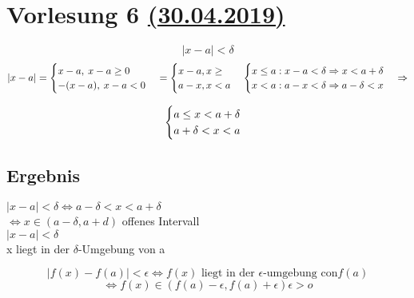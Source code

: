 \section{Vorlesung 6 \href{https://tu-dresden.de/mn/math/algebra/das-institut/beschaeftigte/antje-noack/ressourcen/dateien/v120-1/MathMethInf06.pdf?lang=en}{(30.04.2019)} }


\[|x-a| < \delta \]
\begin{equation}
\\|x-a| = \begin{cases}
	x-a , \: x-a \geq 0  \\
	-(x-a),\:  x-a<0 \\
	\end{cases}
 = \begin{cases}
x-a , x \geq \\
a-x , x < a \\
\end{cases}	
 \begin{cases}
  x \leq a : x-a < \delta \Rightarrow x < a+\delta \\
  x<a : a-x < \delta \Rightarrow a-\delta < x	\end{cases} \Rightarrow 
\end{equation}


\begin{equation}
\\ \begin{cases}
a \leq x < a+\delta  \\
a+\delta < x < a \\
\end{cases}
\end{equation}
\subsection{Ergebnis}
$|x-a|<\delta \Leftrightarrow a-\delta < x < a+ \delta$ \\
$\Leftrightarrow x \in (a-\delta , a+d ) $ offenes Intervall \\
$|x-a| < \delta$ \\

 
 x liegt in der $\delta $-Umgebung von a
	
\[	|f(x) -f(a)| < \epsilon  \Leftrightarrow f(x)\text{ liegt in der }\epsilon\text{-umgebung con} f(a)
							 \] \[\Leftrightarrow f(x) \in \left( f(a)-\epsilon , f(a)+ \epsilon \right) \epsilon > o	 \]
 
